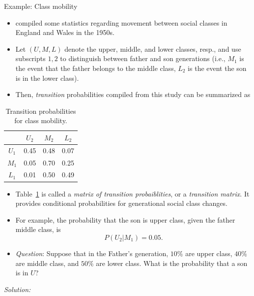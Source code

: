 \begin{frame}[allowframebreaks]{Example: Class mobility}

\begin{itemize}
  \item \citet{glass13} compiled some statistics regarding movement between social classes in England and Wales in the 1950s.
  
  \item Let $(U, M, L)$ denote the upper, middle, and lower classes, resp., and use subscripts $1, 2$ to distinguish between father and son generations (i.e., $M_1$ is the event that the father belongs to the middle class, $L_2$ is the event the son is in the lower class).
  
  \item Then, \emph{transition} probabilities compiled from this study can be summarized as
\end{itemize}
 
  \framebreak
  
  \begin{table}
  \centering
  \caption{\label{tab:mobility}Transition probabilities for class mobility.}
    \begin{tabular}{c|ccc}
            & $U_2$ & $M_2$ & $L_2$ \\\hline
      $U_1$ & 0.45  & 0.48  & 0.07  \\
      $M_1$ & 0.05  & 0.70  & 0.25  \\
      $L_1$ & 0.01  & 0.50  & 0.49  \\
    \end{tabular}
  \end{table}
 
 \begin{itemize}
    \item Table~\ref{tab:mobility} is called a \emph{matrix of transition probaiblities}, or a \emph{transition matrix}. It provides conditional probabilities for generational social class changes.
    \item For example, the probability that the son is upper class, given the father middle class, is
  $$
  P(U_2 | M_1) = 0.05.
  $$
  
  \framebreak
  
    \item \emph{Question}: Suppose that in the Father's generation, $10\%$ are upper class, $40\%$ are middle class, and $50\%$ are lower class. What is the probability that a son is in $U$?
    \end{itemize}

  \emph{Solution:}
  

\end{frame}

